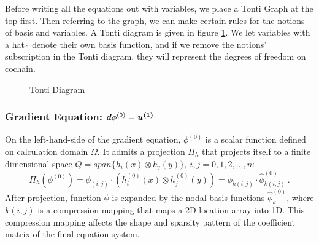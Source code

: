 Before writing all the equations out with variables, we place a Tonti Graph at the top first. Then referring to the graph, we can make certain rules for the notions of basis and variables. A Tonti diagram is given in figure \ref{Tontigraph}. We let variables with a hat $\hat{\ }$ denote their own basis function, and if we remove the notions' subscription in the Tonti diagram, they will represent the degrees of freedom on cochain. \\
\begin{figure}[H]
\centering
\caption{Tonti Diagram}
\label{Tontigraph}
\end{figure}


\subsubsection{Gradient Equation: $\boldsymbol{d} \phi^{(0)} = \boldsymbol{u^{(1)}}$}
On the left-hand-side of the gradient equation, $\phi^{(0)}$ is a scalar function defined on calculation domain $\Omega$. It admits a projection $\Pi_h$ that projects itself to a finite dimensional space $Q =span\{h_i(x) \otimes h_j(y)\},\ i,j = 0,1,2,...,n $: 
\begin{equation}
	\Pi_h(\phi^{(0)}) = \phi_{(i,j)} \cdot \left(h_i^{(0)}(x) \otimes h_j^{(0)}(y) \right) = \phi_{k(i,j)} \cdot \hat{\phi}^{(0)}_{k(i,j)}\ .
\end{equation}
After projection, function $\phi$ is expanded by the nodal basis functions $\hat{\phi}^{(0)}_{k}$, where $k(i,j)$ is a compression mapping that maps a 2D location array into 1D. This compression mapping affects the shape and sparsity pattern of the coefficient matrix of the final equation system. \\

